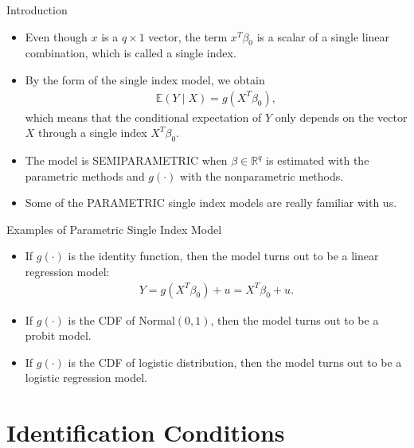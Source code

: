 \documentclass[xcolor=svgnames,dvipdfmx,cjk]{beamer}
\theoremstyle{example}
\begin{document}
\begin{frame}{Introduction}
  \begin{itemize}
    \item Even though $x$ is a $q\times1$ vector, 
          the term $x^{T} \beta_0$ is a scalar of a single linear combination, 
          which is called a single index.
    \item By the form of the single index model, we obtain
          \begin{align*}
            \mathbb{E}(Y \mid X) = g(X^{T} \beta_0),
          \end{align*}
          which means that 
          the conditional expectation of $Y$ 
          only depends on the vector $X$
          through a single index $X^{T} \beta_0$.
    \item The model is SEMIPARAMETRIC 
          when $\beta \in \mathbb{R}^{q}$ is estimated with the parametric methods
          and $g(\cdot)$ with the nonparametric methods.
    \item Some of the PARAMETRIC single index models are really familiar with us.
  \end{itemize}
\end{frame}

\begin{frame}{Examples of Parametric Single Index Model}
  \begin{itemize}
    \item If $g(\cdot)$ is the identity function, 
          then the model turns out to be a linear regression model:
          \begin{align*}
            Y = g (X^{T} \beta_0) + u = X^{T} \beta_0 + u.
          \end{align*}
    \item If $g(\cdot)$ is the CDF of Normal$(0, 1)$,
          then the model turns out to be a probit model.
    \item If $g(\cdot)$ is the CDF of logistic distribution,
          then the model turns out to be a logistic regression model.
  \end{itemize}
  
\end{frame}


\section{Identification Conditions}
\begin{frame}
  \tableofcontents[currentsection]
\end{frame}
\end{document}
